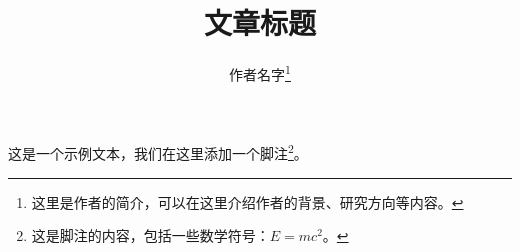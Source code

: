 \documentclass{article}
\title{文章标题}
\author{作者名字\thanks{这里是作者的简介，可以在这里介绍作者的背景、研究方向等内容。}}
\begin{document}
\maketitle

这是一个示例文本，我们在这里添加一个脚注\footnote{这是脚注的内容，包括一些数学符号：$E=mc^2$。}。
\end{document}
